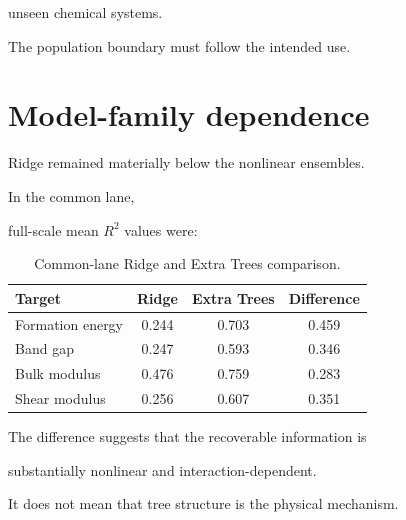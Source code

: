 \documentclass[11pt,a4paper,oneside]{report}
\begin{document}
unseen chemical systems.



The population boundary must follow the intended use.





\section{Model-family dependence}



Ridge remained materially below the nonlinear ensembles.



In the common lane,

full-scale mean $R^2$ values were:



\begin{table}[H]



\centering



\caption{Common-lane Ridge and Extra Trees comparison.}



\label{tab:ridge-extra}



\begin{tabular}{l S[table-format=1.3] S[table-format=1.3] S[table-format=1.3]}
\toprule
\textbf{Target}
&
{\textbf{Ridge}}
&
{\textbf{Extra Trees}}
&
{\textbf{Difference}}
\\
\midrule
Formation energy
&
0.244
&
0.703
&
0.459
\\
Band gap
&
0.247
&
0.593
&
0.346
\\
Bulk modulus
&
0.476
&
0.759
&
0.283
\\
Shear modulus
&
0.256
&
0.607
&
0.351
\\
\bottomrule
\end{tabular}



\end{table}





The difference suggests that the recoverable information is

substantially nonlinear and interaction-dependent.



It does not mean that tree structure is the physical mechanism.
\end{document}
